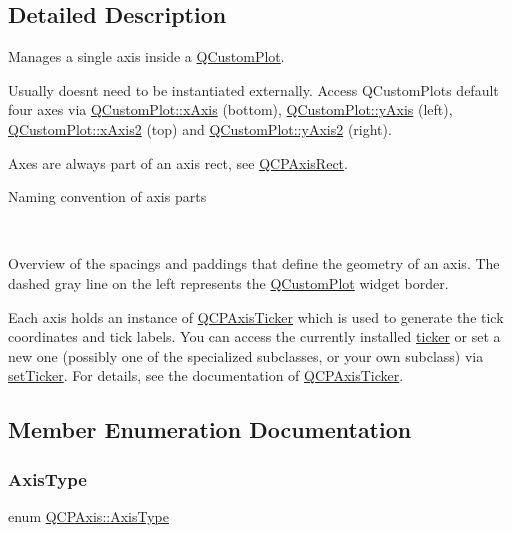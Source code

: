 \subsection{Detailed Description}
Manages a single axis inside a \hyperlink{classQCustomPlot}{Q\+Custom\+Plot}. 

Usually doesn\textquotesingle{}t need to be instantiated externally. Access Q\+Custom\+Plot\textquotesingle{}s default four axes via \hyperlink{classQCustomPlot_a9a79cd0158a4c7f30cbc702f0fd800e4}{Q\+Custom\+Plot\+::x\+Axis} (bottom), \hyperlink{classQCustomPlot_af6fea5679725b152c14facd920b19367}{Q\+Custom\+Plot\+::y\+Axis} (left), \hyperlink{classQCustomPlot_ada41599f22cad901c030f3dcbdd82fd9}{Q\+Custom\+Plot\+::x\+Axis2} (top) and \hyperlink{classQCustomPlot_af13fdc5bce7d0fabd640f13ba805c0b7}{Q\+Custom\+Plot\+::y\+Axis2} (right).

Axes are always part of an axis rect, see \hyperlink{classQCPAxisRect}{Q\+C\+P\+Axis\+Rect}.  \begin{center}Naming convention of axis parts\end{center}  ~\newline
  \begin{center}Overview of the spacings and paddings that define the geometry of an axis. The dashed gray line on the left represents the \hyperlink{classQCustomPlot}{Q\+Custom\+Plot} widget border.\end{center} 

Each axis holds an instance of \hyperlink{classQCPAxisTicker}{Q\+C\+P\+Axis\+Ticker} which is used to generate the tick coordinates and tick labels. You can access the currently installed \hyperlink{classQCPAxis_a7b7a27151be8235059e1294f73ecf615}{ticker} or set a new one (possibly one of the specialized subclasses, or your own subclass) via \hyperlink{classQCPAxis_a4ee03fcd2c74d05cd1a419b9af5cfbdc}{set\+Ticker}. For details, see the documentation of \hyperlink{classQCPAxisTicker}{Q\+C\+P\+Axis\+Ticker}. 

\subsection{Member Enumeration Documentation}
\mbox{\label{classQCPAxis_ae2bcc1728b382f10f064612b368bc18a}} 
\subsubsection{\texorpdfstring{Axis\+Type}{AxisType}}
{\footnotesize\ttfamily enum \hyperlink{classQCPAxis_ae2bcc1728b382f10f064612b368bc18a}{Q\+C\+P\+Axis\+::\+Axis\+Type}}

